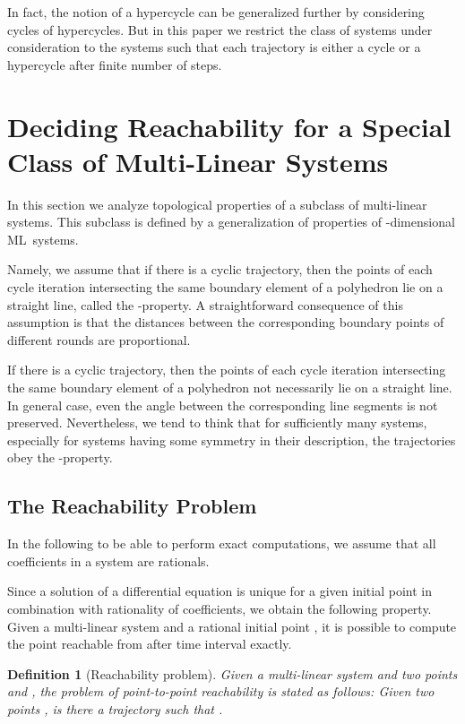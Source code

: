 \documentclass[copyright,creativecommons]{packages/eptcs}
\newcommand{\ml}{\mbox{ML}}
\newtheorem{definition}[theorem]{Definition}
\begin{document}
In fact, the notion of a hypercycle can be generalized further by considering cycles of hypercycles. But in this paper we restrict the class of systems under consideration to the systems such that each trajectory is either a cycle or a hypercycle after finite number of steps. 




\section{Deciding Reachability for a Special Class of Multi-Linear Systems }\label{sec:reachability}

In this section we analyze topological properties of a subclass of multi-linear systems. This subclass is defined by a generalization of properties of -dimensional \ml~systems. 

 Namely, we assume  that if there is a cyclic trajectory, then  the points of each cycle iteration intersecting the same boundary element of a polyhedron lie on a straight line, called the -property. A straightforward consequence of this assumption is that the distances between the corresponding boundary points of different rounds are proportional. 

If there is a cyclic trajectory, then  the points of each cycle iteration intersecting the same boundary element of a polyhedron not necessarily lie on a straight line. In general case, even the angle  between the corresponding line segments is not preserved. Nevertheless, we tend to think that for sufficiently many systems, especially for systems having some symmetry in their description,   the trajectories obey the -property. 

 
\subsection{The Reachability Problem}

In the following to be able to perform exact computations, we assume that all coefficients in a system are rationals.

Since a  solution of a differential equation is unique for a given initial point in combination with rationality of coefficients, we obtain the following property. Given a multi-linear system and a rational  initial  point , it is possible to compute  the point  
reachable  from  after time interval  exactly.  

\begin{definition}[Reachability problem]
 Given a multi-linear system  and two points  and , the problem of point-to-point reachability   is stated as follows: Given two points , is there a trajectory  such that   .
\end{definition}
\end{document}
